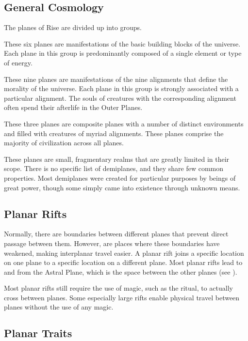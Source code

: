     \subsection{General Cosmology}
        The planes of Rise are divided up into groups.

         These six planes are manifestations of the basic building blocks of the universe.
        Each plane in this group is predominantly composed of a single element or type of energy.

         These nine planes are manifestations of the nine alignments that define the morality of the universe.
        Each plane in this group is strongly associated with a particular alignment.
        The souls of creatures with the corresponding alignment often spend their afterlife in the Outer Planes.

         These three planes are composite planes with a number of distinct environments and filled with creatures of myriad alignments.
        These planes comprise the majority of civilization across all planes.

         These planes are small, fragmentary realms that are greatly limited in their scope.
        There is no specific list of demiplanes, and they share few common properties.
        Most demiplanes were created for particular purposes by beings of great power, though some simply came into existence through unknown means.

    \subsection{Planar Rifts}\label{Planar Rifts}
        Normally, there are boundaries between different planes that prevent direct passage between them.
        However,  are places where these boundaries have weakened, making interplanar travel easier.
        A planar rift joins a specific location on one plane to a specific location on a different plane.
        Most planar rifts lead to and from the Astral Plane, which is the space between the other planes (see ).

        Most planar rifts still require the use of magic, such as the  ritual, to actually cross between planes.
        Some especially large rifts enable physical travel between planes without the use of any magic.

    \subsection{Planar Traits}
